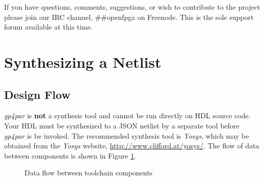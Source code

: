 \documentclass[11pt]{article}
\renewcommand\emph\textbf
\newcommand{\namestyle}[1]{\textit{#1}}
\begin{document}
If you have questions, comments, suggestions, or wish to contribute to the project please join our IRC channel,
\#\#openfpga on Freenode. This is the sole support forum available at this time.

\pagebreak
\section{Synthesizing a Netlist}

\subsection{Design Flow}

\namestyle{gp4par} is \emph{not} a synthesis tool and cannot be run directly on HDL source code. Your HDL must be synthesized to
a JSON netlist by a separate tool before \namestyle{gp4par} is be invoked. The recommended synthesis tool is
\namestyle{Yosys}, which may be obtained from the \namestyle{Yosys} website, \mbox{\url{http://www.clifford.at/yosys/}}. The flow of data
between components is shown in Figure \ref{flow}.

\begin{figure}[h]
\centering



\caption{Data flow between toolchain components}
\label{flow}
\end{figure}
\end{document}

